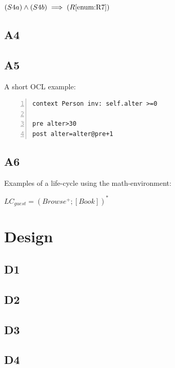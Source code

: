 \documentclass[a4paper,10pt,titlepage,bibtotoc,bibtotocnumbered]{scrreprt}
\begin{document}
$(S4a) \land (S4b) \implies (R\ref{enum:R7})$

\newpage\section{A4}

\newpage\section{A5}
A short OCL example:\\
\lstset{language=OCL}          %

\begin{lstlisting}[frame=single,breaklines=true,numbers=left,numberfirstline=true]
context Person inv: self.alter >=0

pre alter>30
post alter=alter@pre+1

\end{lstlisting}

\newpage\section{A6}

Examples of a life-cycle using the math-environment:

$LC_{guest}=(Browse^+;[Book])^*$



\chapter{Design}

\section{D1}

\section{D2}

\section{D3}

\section{D4}
\end{document}
